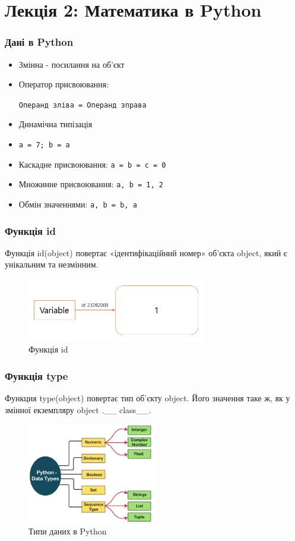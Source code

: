 \section{Лекція 2: Математика в Python}
 
\begin{frame}
\frametitle{Дані в Python}
\begin{itemize}
  \item Змінна - посилання на об'єкт
  \item Оператор присвоювання: 
  
  \texttt{Операнд зліва = Операнд зправа}
  \item Динамічна типізація
  \item \texttt{a = 7; b = a}
  \item Каскадне присвоювання: \texttt{a = b = c = 0}
  \item Множинне присвоювання: \texttt{a, b = 1, 2}
  \item Обмін значеннями: \texttt{a, b = b, a}
\end{itemize}
\end{frame}

\begin{frame}
\frametitle{Функція id}
Функція id(object) повертає «ідентифікаційний номер» об'єкта object, який є унікальним та незмінним.
\begin{figure}
\begin{center}
 \includegraphics[width=0.7\textwidth]{pictures/id_func.png}
\caption{Функція id}
\label{id} 
\end{center}
\end{figure}
\end{frame}

\begin{frame}
\frametitle{Функція type}
Функция type(object) повертає тип об'єкту object. Його значення таке ж, як у змінної екземпляру object .\_\_ class\_\_.
\begin{figure}
\begin{center}
 \includegraphics[width=0.5\textwidth]{pictures/python_data_types.png}
\caption{Типи даних в Python}
\label{data_types} 
\end{center}
\end{figure}
\end{frame}


